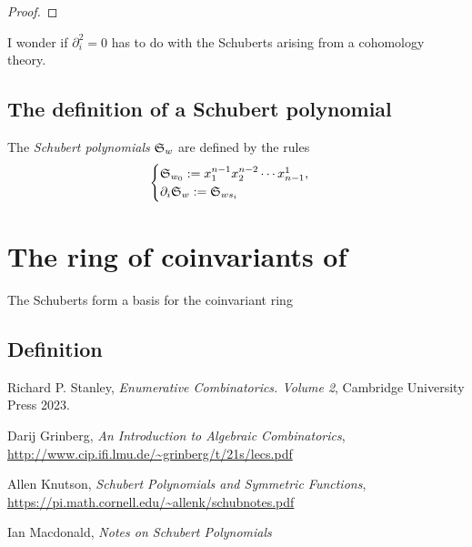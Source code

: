 \documentclass{article}
\newcommand{\frkS}{\ensuremath\mathfrak{S}}
\begin{document}
\begin{proof}
\end{proof}

I wonder if $\partial_i^2 = 0$ has to do with the Schuberts arising from a cohomology theory.

\subsection{The definition of a Schubert polynomial}

\begin{definition}
    The \textit{Schubert polynomials} $\frkS_w$ are defined by the rules
    \[
        \begin{cases}
        \frkS_{w_0} := x_1^{n-1}x_2^{n-2}\cdots x_{n-1}^1, \\
        \partial_i\frkS_w := \frkS_{ws_i}
        \end{cases}
    \]
\end{definition}

\section{The ring of coinvariants of}

\begin{theorem}
    The Schuberts form a basis for the coinvariant ring 
\end{theorem}
\subsection{Definition}



\begin{thebibliography}{999999999}
    \footnotesize \raggedright
    Richard P. Stanley, \textit{Enumerative Combinatorics. Volume 2}, Cambridge University Press 2023.

    Darij Grinberg, \textit{An Introduction to Algebraic Combinatorics}, \url{http://www.cip.ifi.lmu.de/~grinberg/t/21s/lecs.pdf}

    Allen Knutson, \textit{Schubert Polynomials and Symmetric Functions}, \url{https://pi.math.cornell.edu/~allenk/schubnotes.pdf}

    Ian Macdonald, \textit{Notes on Schubert Polynomials}
\end{thebibliography}
\end{document}
